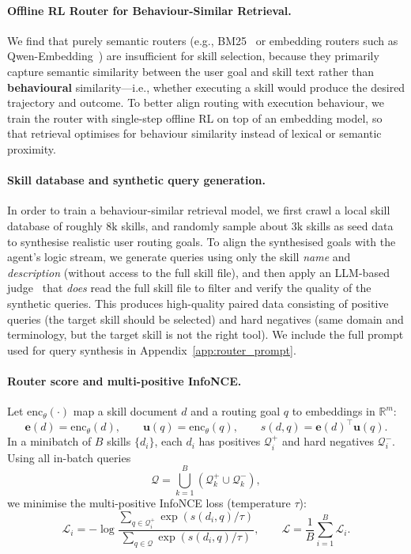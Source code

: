 \documentclass[11pt,a4paper]{article}
\begin{document}
\begin{theorytrack}


\paragraph{Offline RL Router for Behaviour-Similar Retrieval.}
We find that purely semantic routers (e.g., BM25~\cite{robertson2009probabilistic} or embedding routers such as Qwen-Embedding~\cite{qwen3embedding}) are insufficient for skill selection, because they primarily capture semantic similarity between the user goal and skill text rather than \textbf{behavioural} similarity—i.e., whether executing a skill would produce the desired trajectory and outcome.
To better align routing with execution behaviour, we train the router with single-step offline RL on top of an embedding model, so that retrieval optimises for behaviour similarity instead of lexical or semantic proximity.

\paragraph{Skill database and synthetic query generation.}
In order to train a behaviour-similar retrieval model, we first crawl a local skill database of roughly $8\text{k}$ skills, and randomly sample about $3\text{k}$ skills as seed data to synthesise realistic user routing goals. To align the synthesised goals with the agent's logic stream, we generate queries using only the skill \emph{name} and \emph{description} (without access to the full skill file), and then apply an LLM-based judge~\cite{zheng2023judging} that \emph{does} read the full skill file to filter and verify the quality of the synthetic queries.
This produces high-quality paired data consisting of positive queries (the target skill should be selected) and hard negatives (same domain and terminology, but the target skill is not the right tool). We include the full prompt used for query synthesis in Appendix~\ref{app:router_prompt}.

\paragraph{Router score and multi-positive InfoNCE.}
Let $\mathrm{enc}_\theta(\cdot)$ map a skill document $d$ and a routing goal $q$ to embeddings in $\mathbb{R}^m$:
\[
\mathbf{e}(d)=\mathrm{enc}_\theta(d),\qquad \mathbf{u}(q)=\mathrm{enc}_\theta(q),\qquad
s(d,q)=\mathbf{e}(d)^\top \mathbf{u}(q).
\]
In a minibatch of $B$ skills $\{d_i\}$, each $d_i$ has positives $\mathcal{Q}_i^+$ and hard negatives $\mathcal{Q}_i^-$. Using all in-batch queries
\[
\mathcal{Q}=\bigcup_{k=1}^B(\mathcal{Q}_k^+\cup\mathcal{Q}_k^-),
\]
we minimise the multi-positive InfoNCE loss (temperature $\tau$):
\[
\mathcal{L}_i
=
-\log
\frac{
\sum_{q\in \mathcal{Q}_i^{+}}\exp\left(s(d_i,q)/\tau\right)
}{
\sum_{q\in \mathcal{Q}}\exp\left(s(d_i,q)/\tau\right)
},
\qquad
\mathcal{L}=\frac{1}{B}\sum_{i=1}^{B}\mathcal{L}_i .
\]


\end{theorytrack}
\end{document}
